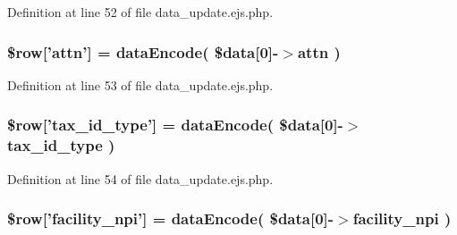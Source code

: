\-Definition at line 52 of file data\-\_\-update.\-ejs.\-php.

\hypertarget{patientfile_2immnunization_2data__update_8ejs_8php_af8886f39ae82fe4c6411bad1e0097c79}{
\subsubsection[{\$row}]{\setlength{\rightskip}{0pt plus 5cm}\$row\mbox{[}'attn'\mbox{]} = {\bf data\-Encode}( \$data\mbox{[}0\mbox{]}-\/$>$attn )}}\label{patientfile_2immnunization_2data__update_8ejs_8php_af8886f39ae82fe4c6411bad1e0097c79}


\-Definition at line 53 of file data\-\_\-update.\-ejs.\-php.

\hypertarget{patientfile_2immnunization_2data__update_8ejs_8php_ad7a9a2a4679ba8036c5c2fa97dee89c4}{
\subsubsection[{\$row}]{\setlength{\rightskip}{0pt plus 5cm}\$row\mbox{[}'tax\-\_\-id\-\_\-type'\mbox{]} = {\bf data\-Encode}( \$data\mbox{[}0\mbox{]}-\/$>$tax\-\_\-id\-\_\-type )}}\label{patientfile_2immnunization_2data__update_8ejs_8php_ad7a9a2a4679ba8036c5c2fa97dee89c4}


\-Definition at line 54 of file data\-\_\-update.\-ejs.\-php.

\hypertarget{patientfile_2immnunization_2data__update_8ejs_8php_abca371c5e770b60b9b3dacacf9877173}{
\subsubsection[{\$row}]{\setlength{\rightskip}{0pt plus 5cm}\$row\mbox{[}'facility\-\_\-npi'\mbox{]} = {\bf data\-Encode}( \$data\mbox{[}0\mbox{]}-\/$>$facility\-\_\-npi )}}\label{patientfile_2immnunization_2data__update_8ejs_8php_abca371c5e770b60b9b3dacacf9877173}


